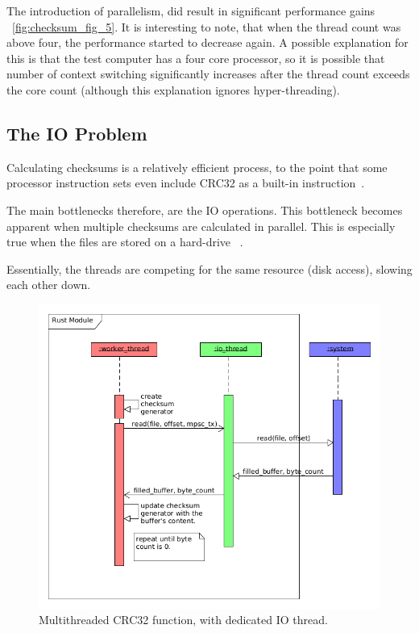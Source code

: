 The introduction of parallelism, did result in significant performance gains ~\ref{fig:checksum_fig_5}.
It is interesting to note, that when the thread count was above four, the performance started to decrease again.
A possible explanation for this is that the test computer has a four core processor, so it is possible that number of context
switching significantly increases after the thread count exceeds the core count (although this explanation
ignores hyper-threading).

\subsection{The IO Problem}
Calculating checksums is a relatively efficient process, to the point that
some processor instruction sets even include CRC32
as a built-in instruction~\cite{CRC32Instruction}.

The main bottlenecks therefore, are the IO operations.
This bottleneck becomes apparent when multiple checksums are calculated in parallel.
This is especially true when the files are stored on a hard-drive ~\cite{PiotrParallelDiskAccess}.

Essentially, the threads are competing for the same resource (disk access), slowing each other down.

\begin{figure}[H]
    \centering
    \includegraphics[width=12cm]{figures/checksum/io_multi_crc}
    \caption{Multithreaded CRC32 function, with dedicated IO thread.}
    \label{fig:checksum_fig_6}
\end{figure}

